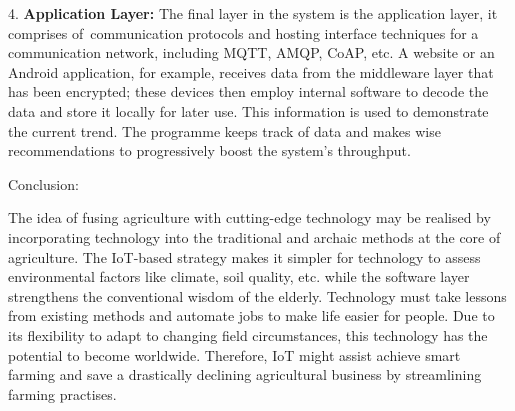 \documentclass[
]{article}
\begin{document}
4. \textbf{{Application Layer:}} The final layer in the system is the
application layer, it comprises of~communication protocols and hosting
interface techniques for a communication network, including MQTT, AMQP,
CoAP, etc. A website or an Android application, for example, receives
data from the middleware layer that has been encrypted; these devices
then employ internal software to decode the data and store it locally
for later use. This information is used to demonstrate the current
trend. The programme keeps track of data and makes wise recommendations
to progressively boost the system's throughput.

Conclusion:

The idea of fusing agriculture with cutting-edge technology may be
realised by incorporating technology into the traditional and archaic
methods at the core of agriculture. The IoT-based strategy makes it
simpler for technology to assess environmental factors like climate,
soil quality, etc. while the software layer strengthens the conventional
wisdom of the elderly. Technology must take lessons from existing
methods and automate jobs to make life easier for people. Due to its
flexibility to adapt to changing field circumstances, this technology
has the potential to become worldwide. Therefore, IoT might assist
achieve smart farming and save a drastically declining agricultural
business by streamlining farming practises.
\end{document}
